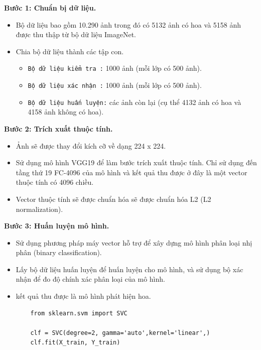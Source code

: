 \documentclass[12pt]{report}
\begin{document}
		\textbf{Bước 1: Chuẩn bị dữ liệu.} 
		\begin{itemize}
			\item Bộ dữ liệu bao gồm 10.290 ảnh trong đó có 5132 ảnh có hoa và 5158 ảnh được thu thập từ bộ dữ liệu ImageNet.
			\item Chia bộ dữ liệu thành các tập con.
			      \begin{itemize}
			      	\item \texttt{Bộ dữ liệu kiểm tra :} 1000 ảnh (mỗi lớp có 500 ảnh).
			      	\item \texttt{Bộ dữ liệu xác nhận :} 1000 ảnh (mỗi lớp có 500 ảnh).
			      	\item \texttt{Bộ dữ liệu huấn luyện:} các ảnh còn lại (cụ thể 4132 ảnh có hoa và 4158 ảnh không có hoa).
			      \end{itemize}
		\end{itemize}
														
		\textbf{Bước 2: Trích xuất thuộc tính.} 
		\begin{itemize}
			\item Ảnh sẽ được thay đổi kích cỡ về dạng 224 x 224.
			\item Sử dụng mô hình VGG19 \cite{cia_vgg19} để làm bước trích xuất thuộc tính. Chỉ sử dụng đến tầng thứ 19 FC-4096 của mô hình và kết quả thu được ở đây là một vector thuộc tính có 4096 chiều.
			\item Vector thuộc tính sẽ được chuẩn hóa sẽ được chuẩn hóa L2 (L2 normalization).
		\end{itemize}
										
		\textbf{Bước 3: Huấn luyện mô hình.} 
		\begin{itemize}
			\item Sử dụng phương pháp máy vector hỗ trợ để xây dựng mô hình phân loại nhị phân (binary classification). 
			\item Lấy bộ dữ liệu huấn luyện để huấn luyện cho mô hình, và sử dụng bộ xác nhận để đo độ chính xác phân loại của mô hình.
			\item kết quả thu được là mô hình phát hiện hoa.	

		\begin{lstlisting}
	from sklearn.svm import SVC
		
    clf = SVC(degree=2, gamma='auto',kernel='linear',)
    clf.fit(X_train, Y_train)
    		\end{lstlisting}
				      			      			      
		\end{itemize}
										
\end{document}
